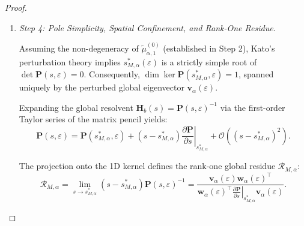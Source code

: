 \documentclass[11pt,a4paper]{article}
\numberwithin{equation}{section}
\begin{document}
\begin{proof}
\begin{enumerate}
Defining the perturbed pole as $s_{M, \alpha}^\ast(\varepsilon) = -\eta_{M, \alpha}(\varepsilon) + i\omega_{M, \alpha}(\varepsilon)$, we separate the real damping and the shifted frequency. The perturbed cluster frequency $\omega_{M, \alpha}(\varepsilon)$ is determined by the imaginary projection of the shift:
$$ \omega_{M, \alpha}(\varepsilon) = \omega_{M,\alpha} + \Im(\delta(\varepsilon)) = \omega_{M,\alpha} - \frac{\omega_{M,\alpha}^3}{2} \widetilde{\mu}_{\alpha, 1}^{(0)} \varepsilon^{1-p} - \frac{\omega_{M,\alpha}^5}{8} \big(\widetilde{\mu}_{\alpha, 1}^{(0)}\big)^2 \varepsilon^{2-2p} + \mathcal{O}(\varepsilon^{\min(1, 3-3p)}). $$
Correspondingly, the cluster damping $\eta_{M, \alpha}$ is determined by the real projection. Because the lower-order shifts are purely imaginary ($\Re(c_{1-p}) = \Re(c_{2-2p}) = 0$), the leading-order damping is rigorously isolated at $\mathcal{O}(\varepsilon^1)$:
$$ \eta_{M, \alpha}(\varepsilon) = -\Re(\delta(\varepsilon)) = \frac{\omega_{M,\alpha}^3}{2} \mathbf{M}_{11}^{(\alpha)} \varepsilon + \mathcal{O}(\varepsilon^{>1}). $$
Consequently, the leading-order damping $\eta_{M,\alpha}=\mathcal{O}(\varepsilon)$ is globally decoupled and inter-cluster terms satisfy $[\Gamma^{(1)}]_{\alpha\beta} \in \operatorname{ker}\big(\mathbf{w}_\alpha^{(0)\top}(\cdot)\mathbf{v}_\alpha^{(0)}\big)$ for all $\alpha\ne \beta.$

\item \textit{Step 4: Pole Simplicity, Spatial Confinement, and Rank-One Residue.}

\medskip
\noindent
Assuming the non-degeneracy of $\widetilde{\mu}_{\alpha, 1}^{(0)}$ (established in Step 2), Kato's perturbation theory implies $s_{M, \alpha}^\ast(\varepsilon)$ is a strictly simple root of $\det \mathbf{P}(s, \varepsilon) = 0$. Consequently, $\dim \ker \mathbf{P}(s_{M, \alpha}^\ast, \varepsilon) = 1$, spanned uniquely by the perturbed global eigenvector $\mathbf{v}_\alpha(\varepsilon)$. 

Expanding the global resolvent $\mathbf{H}_b(s) = \mathbf{P}(s, \varepsilon)^{-1}$ via the first-order Taylor series of the matrix pencil yields:
\begin{equation}
    \mathbf{P}(s, \varepsilon) = \mathbf{P}(s_{M, \alpha}^\ast, \varepsilon) + (s - s_{M, \alpha}^\ast) \left. \frac{\partial \mathbf{P}}{\partial s} \right|_{s_{M, \alpha}^\ast} + \mathcal{O}((s - s_{M, \alpha}^\ast)^2).
\end{equation}

The projection onto the 1D kernel defines the rank-one global residue $\mathcal{R}_{M, \alpha}$:
\begin{equation}
    \mathcal{R}_{M, \alpha} = \lim_{s \to s_{M, \alpha}^\ast} (s - s_{M, \alpha}^\ast) \mathbf{P}(s, \varepsilon)^{-1} = \frac{\mathbf{v}_\alpha(\varepsilon) \mathbf{w}_\alpha(\varepsilon)^\top}{\mathbf{w}_\alpha(\varepsilon)^\top \left. \frac{\partial \mathbf{P}}{\partial s} \right|_{s_{M, \alpha}^\ast} \mathbf{v}_\alpha(\varepsilon)}.
\end{equation}


\end{enumerate}
\end{proof}
\end{document}
